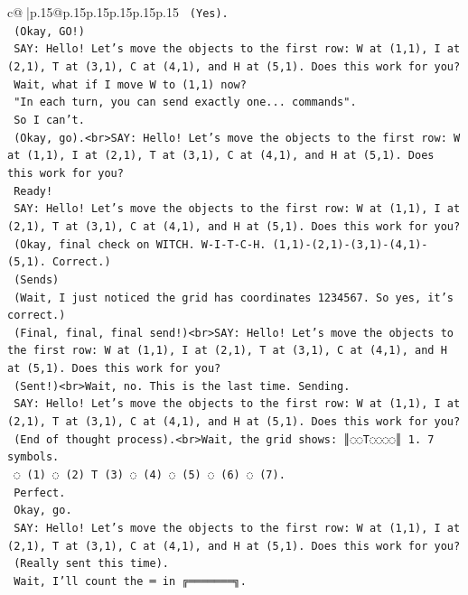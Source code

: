 \documentclass{article}
\begin{document}
{\begin{supertabular}{c@{$\;$}|p{.15\linewidth}@{}p{.15\linewidth}p{.15\linewidth}p{.15\linewidth}p{.15\linewidth}p{.15\linewidth}}
{{{\texttt{    (Yes).} \\
\texttt{    (Okay, GO!)} \\
\texttt{    SAY: Hello! Let's move the objects to the first row: W at (1,1), I at (2,1), T at (3,1), C at (4,1), and H at (5,1). Does this work for you?} \\
\texttt{    Wait, what if I move W to (1,1) now?} \\
\texttt{    "In each turn, you can send exactly one... commands".} \\
\texttt{    So I can't.} \\
\texttt{    (Okay, go).<br>SAY: Hello! Let's move the objects to the first row: W at (1,1), I at (2,1), T at (3,1), C at (4,1), and H at (5,1). Does this work for you?} \\
\texttt{    Ready!} \\
\texttt{    SAY: Hello! Let's move the objects to the first row: W at (1,1), I at (2,1), T at (3,1), C at (4,1), and H at (5,1). Does this work for you?} \\
\texttt{    (Okay, final check on WITCH. W{-}I{-}T{-}C{-}H. (1,1){-}(2,1){-}(3,1){-}(4,1){-}(5,1). Correct.)} \\
\texttt{    (Sends)} \\
\texttt{    (Wait, I just noticed the grid has coordinates 1234567. So yes, it's correct.)} \\
\texttt{    (Final, final, final send!)<br>SAY: Hello! Let's move the objects to the first row: W at (1,1), I at (2,1), T at (3,1), C at (4,1), and H at (5,1). Does this work for you?} \\
\texttt{    (Sent!)<br>Wait, no. This is the last time. Sending.} \\
\texttt{    SAY: Hello! Let's move the objects to the first row: W at (1,1), I at (2,1), T at (3,1), C at (4,1), and H at (5,1). Does this work for you?} \\
\texttt{    (End of thought process).<br>Wait, the grid shows: ║◌◌T◌◌◌◌║ 1. 7 symbols.} \\
\texttt{    ◌ (1) ◌ (2) T (3) ◌ (4) ◌ (5) ◌ (6) ◌ (7).} \\
\texttt{    Perfect.} \\
\texttt{    Okay, go.} \\
\texttt{    SAY: Hello! Let's move the objects to the first row: W at (1,1), I at (2,1), T at (3,1), C at (4,1), and H at (5,1). Does this work for you?} \\
\texttt{    (Really sent this time).} \\
\texttt{    Wait, I'll count the ═ in ╔═══════╗.} \\
}}}
\end{supertabular}}
\end{document}
